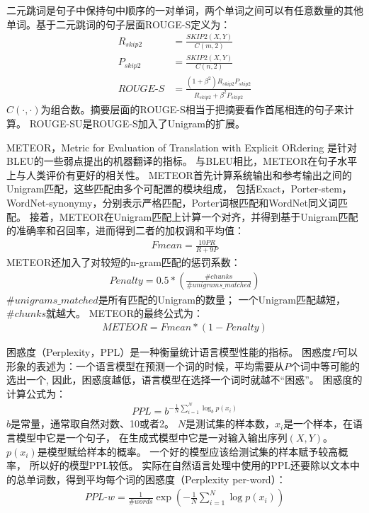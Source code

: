 二元跳词是句子中保持句中顺序的一对单词，两个单词之间可以有任意数量的其他单词。基于二元跳词的句子层面ROUGE-S定义为：
\begin{align}
    R_{skip2} &= \frac{\textit{SKIP2}(X, Y)}{C(m, 2)} \\
    P_{skip2} &= \frac{\textit{SKIP2}(X, Y)}{C(n, 2)} \\
    \textit{ROUGE-S} &= \frac{(1 + \beta^2) R_{skip2}P_{skip2}}{R_{skip2} + \beta^2 P_{skip2}}
\end{align}
$C(\cdot, \cdot)$为组合数。摘要层面的ROUGE-S相当于把摘要看作首尾相连的句子来计算。
ROUGE-SU是ROUGE-S加入了Unigram的扩展。

METEOR，Metric for Evaluation of Translation with Explicit ORdering
是针对BLEU的一些弱点提出的机器翻译的指标。
与BLEU相比，METEOR在句子水平上与人类评价有更好的相关性。
METEOR首先计算系统输出和参考输出之间的Unigram匹配，这些匹配由多个可配置的模块组成，
包括Exact，Porter-stem，WordNet-synonymy，分别表示严格匹配，Porter词根匹配和WordNet同义词匹配。
接着，METEOR在Unigram匹配上计算一个对齐，并得到基于Unigram匹配的准确率和召回率，进而得到二者的加权调和平均值：
\begin{align}
    \textit{Fmean} = \frac{10PR}{R + 9P}
\end{align}
METEOR还加入了对较短的n-gram匹配的惩罚系数：
\begin{align}
    \textit{Penalty} = 0.5 * \left( \frac{\#chunks}{\#unigrams\_matched} \right)
\end{align}
$\#unigrams\_matched$是所有匹配的Unigram的数量；
一个Unigram匹配越短，$\#chunks$就越大。
METEOR的最终公式为：
\begin{align}
    \textit{METEOR} = \textit{Fmean} * (1 - \textit{Penalty})
\end{align}

困惑度（Perplexity，PPL）是一种衡量统计语言模型性能的指标。
困惑度$P$可以形象的表述为：一个语言模型在预测一个词的时候，平均需要从$P$个词中等可能的选出一个,
因此，困惑度越低，语言模型在选择一个词时就越不“困惑”。
困惑度的计算公式为：
\begin{align}
    \textit{PPL} = b^{-\frac{1}{N} \sum_{i=1}^N \log_b p(x_i)}
\end{align}
$b$是常量，通常取自然对数、10或者2。
$N$是测试集的样本数，$x_i$是一个样本，在语言模型中它是一个句子，
在生成式模型中它是一对输入输出序列$(X, Y)$。
$p(x_i)$是模型赋给样本的概率。
一个好的模型应该给测试集的样本赋予较高概率，
所以好的模型PPL较低。
实际在自然语言处理中使用的PPL还要除以文本中的总单词数，得到平均每个词的困惑度（Perplexity per-word）：
\begin{align}
    \textit{PPL-w} = \frac{1}{\#\textit{words}} \exp(-\frac{1}{N} \sum_{i=1}^N \log p(x_i))
\end{align}

